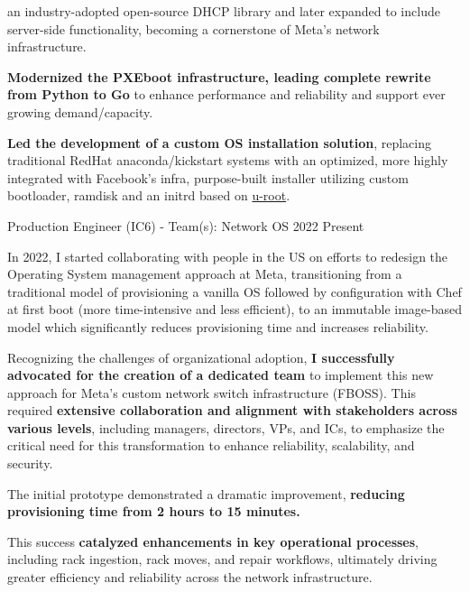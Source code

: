 \begin{cventries}
{\begin{cvitems}
{                  an industry-adopted open-source DHCP library and later expanded to include server-side functionality,
                  becoming a cornerstone of Meta's network infrastructure.}
      \item {\textbf{Modernized the PXEboot infrastructure, leading complete rewrite from Python
                    to Go} to enhance performance and reliability and support ever growing demand/capacity.}
      \item {\textbf{Led the development of a custom OS installation solution}, replacing traditional RedHat
                  anaconda/kickstart systems with an optimized, more highly integrated with Facebook's infra, purpose-built installer utilizing custom bootloader, ramdisk and an initrd based on \href{https://github.com/u-root/u-root}{u-root}.}
    \end{cvitems}
  }

  \cventryprevrole
  {Production Engineer (IC6) - Team(s): Network OS}
  {2022 \newline Present}
  {
    In 2022, I started collaborating with people in the US on efforts to redesign the Operating System management approach at Meta, transitioning from a traditional model of provisioning a vanilla OS followed by configuration with Chef at first boot (more time-intensive and less efficient), to an immutable image-based model which
    significantly reduces provisioning time and increases reliability.
    \vspace{2mm}
    \begin{cvitems}
      \item Recognizing the challenges of organizational adoption, \textbf{I successfully advocated for the creation of a dedicated team} to implement this new approach for Meta's custom network switch infrastructure (FBOSS). This required \textbf{extensive collaboration and alignment with stakeholders across various levels}, including managers, directors, VPs, and ICs, to emphasize the critical need for this transformation to enhance reliability, scalability, and security.
      \item The initial prototype demonstrated a dramatic improvement, \textbf{reducing provisioning time from 2 hours to 15 minutes.}
      \item This success \textbf{catalyzed enhancements in key operational processes}, including rack ingestion, rack moves, and repair workflows, ultimately driving greater efficiency and reliability across the network infrastructure.
    \end{cvitems}
  }


\end{cventries}

